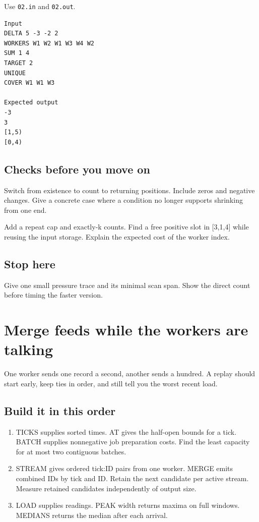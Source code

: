 \documentclass[11pt,letterpaper]{article}
\begin{document}
Use \texttt{02.in} and \texttt{02.out}.

\begin{samepage}
\small
\begin{verbatim}
Input
DELTA 5 -3 -2 2
WORKERS W1 W2 W1 W3 W4 W2
SUM 1 4
TARGET 2
UNIQUE
COVER W1 W1 W3

Expected output
-3
3
[1,5)
[0,4)
\end{verbatim}
\end{samepage}

\subsection*{Checks before you move on}

Switch from existence to count to returning positions. Include zeros and negative changes. Give a concrete case where a condition no longer supports shrinking from one end.

Add a repeat cap and exactly-k counts. Find a free positive slot in [3,1,4] while reusing the input storage. Explain the expected cost of the worker index.

\subsection*{Stop here}

Give one small pressure trace and its minimal scan span. Show the direct count before timing the faster version.

\clearpage

\section{Merge feeds while the workers are talking}\label{datacenter:03}

One worker sends one record a second, another sends a hundred. A replay should start early, keep ties in order, and still tell you the worst recent load.

\subsection*{Build it in this order}

\begin{enumerate}
\item TICKS supplies sorted times. AT gives the half-open bounds for a tick. BATCH supplies nonnegative job preparation costs. Find the least capacity for at most two contiguous batches.
\item STREAM gives ordered tick:ID pairs from one worker. MERGE emits combined IDs by tick and ID. Retain the next candidate per active stream. Measure retained candidates independently of output size.
\item LOAD supplies readings. PEAK width returns maxima on full windows. MEDIANS returns the median after each arrival.
\end{enumerate}
\end{document}
